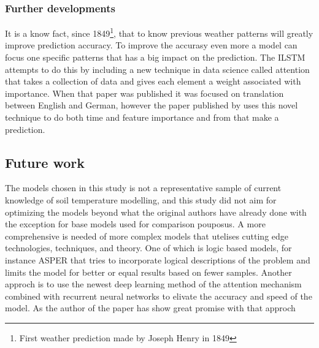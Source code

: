 \subsubsection{Further developments}

It is a know fact, since 1849\footnote{First weather prediction made by Joseph Henry in 1849}, that to know previous weather patterns will greatly improve prediction accuracy. To improve the accurasy even more a model can focus one specific patterns that has a big impact on the prediction. The ILSTM attempts to do this by including a new technique in data science called attention\cite{vaswani_attention_2017} that takes a collection of data and gives each element a weight associated with importance. When that paper was published it was focused on translation between English and German, however the paper published by \citeauthor{li_attention-aware_2022} uses this novel technique to do both time and feature importance and from that make a prediction.

\subsection{Future work}

The models chosen in this study is not a representative sample of current knowledge of soil temperature modelling, and this study did not aim for optimizing the models beyond what the original authors have already done with the exception for base models used for comparison pouposus. A more comprehensive is needed of more complex models that utelises cutting edge technologies, techniques, and theory. One of which is logic based models, for instance ASPER\cite{le_asper_2023} that tries to incorporate logical descriptions of the problem and limits the model for better or equal results based on fewer samples\cite{machot_bridging_2023}. Another approch is to use the newest deep learning method of the attention mechanism\cite{vaswani_attention_2017} combined with recurrent neural networks to elivate the accuracy and speed of the model. As the author of the paper \cite{li_attention-aware_2022} has show great promise with that approch

